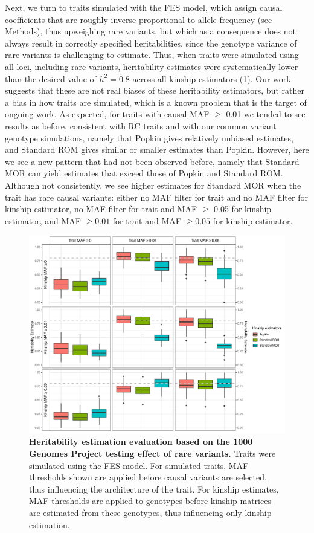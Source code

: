 \documentclass[11pt]{article}
\begin{document}
Next, we turn to traits simulated with the FES model, which assign causal coefficients that are roughly inverse proportional to allele frequency (see Methods), thus upweighing rare variants, but which as a consequence does not always result in correctly specified heritabilities, since the genotype variance of rare variants is challenging to estimate.  Thus, when traits were simulated using all loci, including rare variants, heritability estimates were systematically lower than the desired value of $h^2=0.8$ across all kinship estimators (\cref{fig:tgp_sim_fes}).  Our work suggests that these are not real biases of these heritability estimators, but rather a bias in how traits are simulated, which is a known problem that is the target of ongoing work.  As expected, for traits with causal MAF $\ge$ 0.01 we tended to see results as before, consistent with RC traits and with our common variant genotype simulations, namely that Popkin gives relatively unbiased estimates, and Standard ROM gives similar or smaller estimates than Popkin.  However, here we see a new pattern that had not been observed before, namely that Standard MOR can yield estimates that exceed those of Popkin and Standard ROM.  Although not consistently, we see higher estimates for Standard MOR when the trait has rare causal variants: either no MAF filter for trait and no MAF filter for kinship estimator, no MAF filter for trait and MAF $\ge$ 0.05 for kinship estimator, and MAF $\ge 0.01$ for trait and MAF $\ge 0.05$ for kinship estimator.

\begin{figure}[bp!]
  \centering
  \includegraphics[width=\textwidth]{data/tgp_sim_fes.pdf}
  \caption{
    {\bf Heritability estimation evaluation based on the 1000 Genomes Project testing effect of rare variants.}
    Traits were simulated using the FES model.
    For simulated traits, MAF thresholds shown are applied before causal variants are selected, thus influencing the architecture of the trait.
    For kinship estimates, MAF thresholds are applied to genotypes before kinship matrices are estimated from these genotypes, thus influencing only kinship estimation.
    }
  \label{fig:tgp_sim_fes}
\end{figure}
\end{document}
